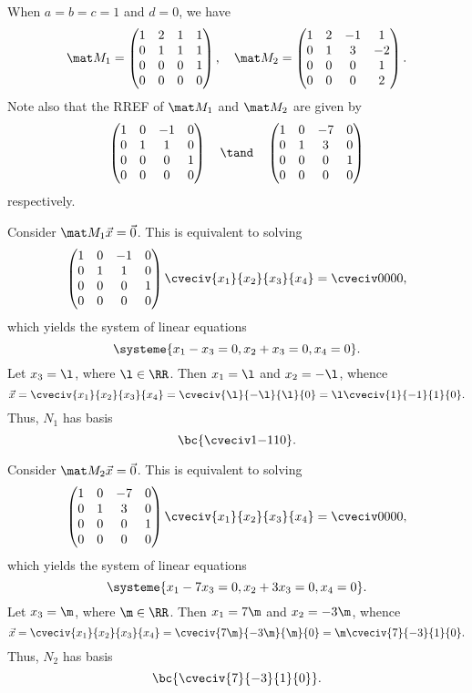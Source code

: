 \begin{solution}
    \begin{ppart}
        When $a = b = c = 1$ and $d = 0$, we have \[\mat M_1 = \begin{pmatrix}1 & 2 & 1 & 1 \\ 0 & 1 & 1 & 1 \\ 0 & 0 & 0 & 1 \\ 0 & 0 & 0 & 0\end{pmatrix}, \quad \mat M_2 = \begin{pmatrix} 1 & 2 & -1 & 1 \\ 0 & 1 & 3 & -2 \\ 0 & 0 & 0 & 1 \\ 0 & 0 & 0 & 2 \end{pmatrix}.\] Note also that the RREF of $\mat M_1$ and $\mat M_2$ are given by \[\begin{pmatrix}1 & 0 & -1 & 0 \\ 0 & 1 & 1 & 0 \\ 0 & 0 & 0 & 1 \\ 0 & 0 & 0 & 0\end{pmatrix} \quad \tand \quad \begin{pmatrix}1 & 0 & -7 & 0 \\ 0 & 1 & 3 & 0 \\ 0 & 0 & 0 & 1 \\ 0 & 0 & 0 & 0\end{pmatrix}\] respectively.

        Consider $\mat M_1 \vec x = \vec 0$. This is equivalent to solving \[\begin{pmatrix}1 & 0 & -1 & 0 \\ 0 & 1 & 1 & 0 \\ 0 & 0 & 0 & 1 \\ 0 & 0 & 0 & 0\end{pmatrix} \cveciv{x_1}{x_2}{x_3}{x_4} = \cveciv0000,\] which yields the system of linear equations \[\systeme{x_1 - x_3 = 0, x_2 + x_3 = 0, x_4 = 0}.\] Let $x_3 = \l$, where $\l \in \RR$. Then $x_1 = \l$ and $x_2 = -\l$, whence \[\vec x = \cveciv{x_1}{x_2}{x_3}{x_4} = \cveciv{\l}{-\l}{\l}{0} = \l \cveciv{1}{-1}{1}{0}.\] Thus, $N_1$ has basis \[\bc{\cveciv1{-1}10}.\]

        Consider $\mat M_2 \vec x = \vec 0$. This is equivalent to solving \[\begin{pmatrix}1 & 0 & -7 & 0 \\ 0 & 1 & 3 & 0 \\ 0 & 0 & 0 & 1 \\ 0 & 0 & 0 & 0\end{pmatrix} \cveciv{x_1}{x_2}{x_3}{x_4} = \cveciv0000,\] which yields the system of linear equations \[\systeme{x_1 - 7x_3 = 0, x_2 + 3x_3 = 0, x_4 = 0}.\] Let $x_3 = \m$, where $\m \in \RR$. Then $x_1 = 7\m$ and $x_2 = -3\m$, whence \[\vec x = \cveciv{x_1}{x_2}{x_3}{x_4} = \cveciv{7\m}{-3\m}{\m}{0} = \m \cveciv{7}{-3}{1}{0}.\] Thus, $N_2$ has basis \[\bc{\cveciv{7}{-3}{1}{0}}.\]


\end{ppart}
\end{solution}
